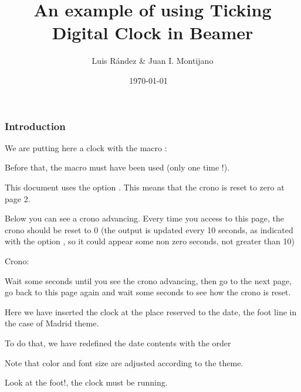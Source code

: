\documentclass[10pt]{beamer}
\title{An example of using Ticking Digital Clock in Beamer}
\author{Luis R\'{a}ndez \& Juan I. Montijano}
\institute[IUMA]{IUMA \\ Universidad de Zaragoza }
\date{\today}
\begin{document}
\frame{\titlepage}

\begin{frame}[t]
\frametitle{Introduction}

\initclock  %

We are putting here a clock with the macro  \quad
{}:

\bigskip

\tdclock

\bigskip

Before that, the macro \quad  {}
\quad must have been used (only one time !).

\bigskip
This document uses the option . This means
that the crono is reset to zero at page 2.

Below you can see a crono advancing.  Every time you access to this page,
the crono should be reset to 0 (the output is updated every 10 seconds, as indicated
with the option , so it could appear
some non zero seconds, not greater than 10)

\bigskip
Crono: \quad\cronominutes\pdfcolon\cronoseconds

\bigskip

Wait some seconds until you see the crono advancing, then go to the next page, go back
to this page again and wait some seconds to see
how the crono is reset.

\end{frame}

%

\date{\tddate\ \ \tdtime}

\begin{frame}


Here we have inserted the clock at the place reserved to the date, the foot line in the case of Madrid theme.

\medskip

To do that, we have redefined the date contents with the order
\medskip

\centerline{ }

\medskip

Note that color and font size are adjusted according to the theme.

\medskip

Look at the foot!, the clock must be running.

\end{frame}
\end{document}
